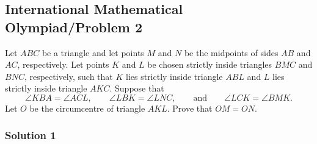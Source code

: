 \documentclass[11pt]{article}
\begin{document}
\newpage
\subsection{International Mathematical Olympiad/Problem 2}
\begin{problem*}
    Let $ABC$ be a triangle and let points $M$ and $N$ be the midpoints of sides $AB$ and $AC$, respectively. Let points $K$ and $L$ be chosen strictly inside triangles $BMC$ and $BNC$, respectively, such that $K$ lies strictly inside triangle $ABL$ and $L$ lies strictly inside triangle $AKC$. Suppose that
\[
\angle KBA = \angle ACL, \qquad \angle LBK = \angle LNC, \qquad \text{and} \qquad \angle LCK = \angle BMK.
\]
Let $O$ be the circumcentre of triangle $AKL$. Prove that $OM = ON$.
\end{problem*}
\subsubsection{Solution 1}
\end{document}
